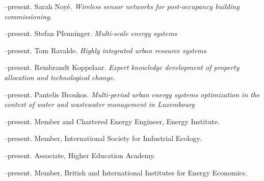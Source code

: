 \documentclass[11pt,a4paper]{article}
\begin{document}
--present.  Sarah Noy\'{e}. \emph{Wireless sensor networks for post-occupancy building commissioning}.  

--present.  Stefan Pfenninger. \emph{Multi-scale energy systems}

--present.  Tom Ravalde. \emph{Highly integrated urban resource systems}

--present.  Rembrandt Koppelaar. \emph{Expert knowledge development of property allocation and technological change}.

--present.  Pantelis Broukos. \emph{Multi-period urban energy systems optimization in the context of water and wastewater management in Luxembourg}
\bigskip

\noindent{}%
%
--present.  Member and Chartered Energy Engineer, Energy Institute.

--present.  Member, International Society for Industrial Ecology.

--present.  Associate, Higher Education Academy.

--present.  Member, British and International Institutes for Energy Economics.
\end{document}
